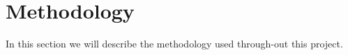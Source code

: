 \section{Methodology}
% 
In this section we will describe the methodology used through-out this project.
% 
